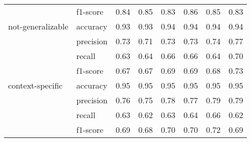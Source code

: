 \begin{tabular}{llrrrrrr}
                 & f1-score &             0.84 &             0.85 &             0.83 &             0.86 &             0.85 &              0.83 \\
not-generalizable & accuracy &             0.93 &             0.93 &             0.94 &             0.94 &             0.94 &              0.94 \\
                 & precision &             0.73 &             0.71 &             0.73 &             0.73 &             0.74 &              0.77 \\
                 & recall &             0.63 &             0.64 &             0.66 &             0.66 &             0.64 &              0.70 \\
                 & f1-score &             0.67 &             0.67 &             0.69 &             0.69 &             0.68 &              0.73 \\
context-specific & accuracy &             0.95 &             0.95 &             0.95 &             0.95 &             0.95 &              0.95 \\
                 & precision &             0.76 &             0.75 &             0.78 &             0.77 &             0.79 &              0.79 \\
                 & recall &             0.63 &             0.62 &             0.63 &             0.64 &             0.66 &              0.62 \\
                 & f1-score &             0.69 &             0.68 &             0.70 &             0.70 &             0.72 &              0.69 \\
\bottomrule
\end{tabular}
